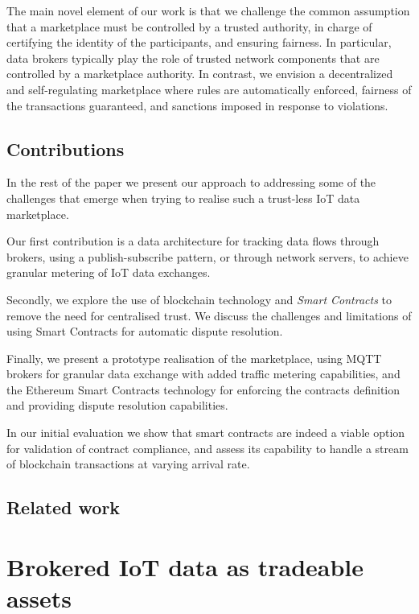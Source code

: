 \documentclass[conference]{IEEEtran}
\begin{document}
The main novel element of our work is that we challenge the common assumption that a marketplace must be controlled by a trusted authority, in charge of certifying the identity of the participants, and ensuring fairness. 
In particular, data brokers typically play the role of trusted network components that are controlled by a marketplace authority.
%
In contrast, we envision a decentralized and self-regulating marketplace where rules are automatically enforced,  fairness of the transactions guaranteed, and sanctions imposed in response to violations.
%

\subsection{Contributions}

In the rest of the paper we present our approach to addressing some of the challenges that emerge when trying to realise such a trust-less IoT data marketplace.

Our first contribution is a data architecture for tracking data flows through brokers, using a publish-subscribe pattern, or through network servers, to achieve granular metering of IoT data exchanges.

Secondly, we explore the use of blockchain technology and \textit{Smart Contracts} \cite{SMART-CONTRACTS} to remove the need for centralised trust. We discuss the challenges and limitations of using Smart Contracts for automatic dispute resolution.

Finally, we present a prototype realisation of the marketplace, using MQTT brokers for granular data exchange with added traffic metering capabilities, and the Ethereum Smart Contracts technology for enforcing the contracts definition and providing dispute resolution capabilities.

In our initial evaluation we show that smart contracts are indeed a viable option for validation of contract compliance, and assess its capability to handle a stream of blockchain transactions at varying arrival rate.

\subsection{Related work}

	
\section{Brokered IoT data as tradeable assets}
\end{document}
